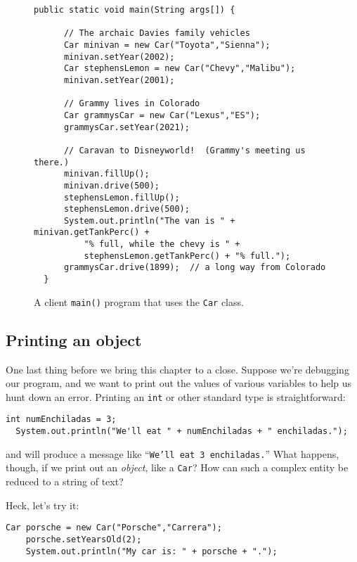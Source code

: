 \begin{figure}[h]
\centering
\begin{Verbatim}[samepage=true,fontsize=\footnotesize,frame=single]
  public static void main(String args[]) {
  
      // The archaic Davies family vehicles
      Car minivan = new Car("Toyota","Sienna");
      minivan.setYear(2002);
      Car stephensLemon = new Car("Chevy","Malibu");
      minivan.setYear(2001);
  
      // Grammy lives in Colorado
      Car grammysCar = new Car("Lexus","ES");
      grammysCar.setYear(2021);
  
      // Caravan to Disneyworld!  (Grammy's meeting us there.)
      minivan.fillUp();
      minivan.drive(500);
      stephensLemon.fillUp();
      stephensLemon.drive(500);
      System.out.println("The van is " + minivan.getTankPerc() + 
          "% full, while the chevy is " +
          stephensLemon.getTankPerc() + "% full.");
      grammysCar.drive(1899);  // a long way from Colorado
  }
\end{Verbatim}
\caption{A client \texttt{main()} program that uses the \texttt{Car} class.}
\label{fig:wholeNewWorld}
\end{figure}


\subsection{Printing an object}

One last thing before we bring this chapter to a close. Suppose we're
debugging our program, and we want to print out the values of various
variables to help us hunt down an error. Printing an \texttt{int} or other
standard type is straightforward:

\begin{Verbatim}[samepage=true,fontsize=\scriptsize,frame=single]
  int numEnchiladas = 3;
  System.out.println("We'll eat " + numEnchiladas + " enchiladas.");
\end{Verbatim}

and will produce a message like ``\texttt{We'll eat 3 enchiladas.}'' What
happens, though, if we print out an \textit{object}, like a \texttt{Car}? How
can such a complex entity be reduced to a string of text?

Heck, let's try it:

\begin{Verbatim}[samepage=true,fontsize=\scriptsize,frame=single]
    Car porsche = new Car("Porsche","Carrera");
    porsche.setYearsOld(2);
    System.out.println("My car is: " + porsche + ".");
\end{Verbatim}

